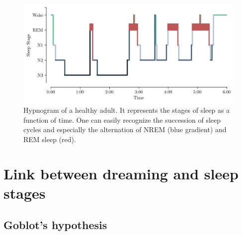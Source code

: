 \vspace{10mm}

\begin{figure}[htb]
	\includegraphics[width=\textwidth]{Fig/Intro/Intro_Hypnogram/Intro_Hypnogram.png}
	\caption[Hypnogram of a healthy adult]{Hypnogram of a healthy adult. It represents the stages of sleep as a function of time. One can easily recognize the succession of sleep cycles and especially the alternation of NREM (blue gradient) and REM sleep (red).}
	\label{fig:intro:hypno}
\end{figure}

%

\section{Link between dreaming and sleep stages}
\label{sec:dream-research:link}

\subsection{Goblot's hypothesis}
\label{sec:dream-research:link:goblot}

